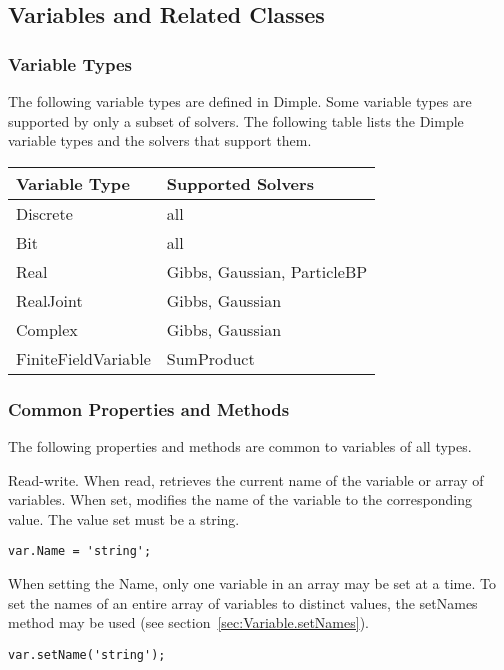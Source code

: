 \subsection{Variables and Related Classes}

\subsubsection{Variable Types}

The following variable types are defined in Dimple.  Some variable types are supported by only a subset of solvers.  The following table lists the Dimple variable types and the solvers that support them.

\begin{longtable} {l | p{5cm}}
Variable Type & Supported Solvers \\
\hline
\endhead
Discrete & all \\
Bit & all \\
Real & Gibbs, Gaussian, ParticleBP \\
RealJoint & Gibbs, Gaussian \\ 
Complex & Gibbs, Gaussian \\
FiniteFieldVariable & SumProduct \\
\end{longtable} 

\subsubsection{Common Properties and Methods}

The following properties and methods are common to variables of all types.



Read-write.  When read, retrieves the current name of the variable or array of variables.  When set, modifies the name of the variable to the corresponding value.  The value set must be a string.

\ifmatlab
\begin{lstlisting}
var.Name = 'string';
\end{lstlisting}

When setting the Name, only one variable in an array may be set at a time.  To set the names of an entire array of variables to distinct values, the setNames method may be used (see section~\ref{sec:Variable.setNames}).

\fi

\ifjava
\begin{lstlisting}
var.setName('string');
\end{lstlisting}

